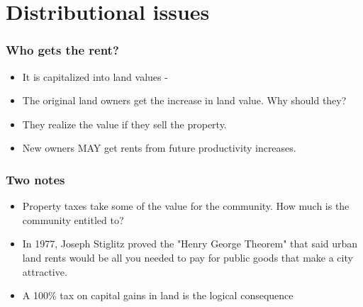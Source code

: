 \documentclass[notes]{beamer}
\begin{document}
\begin{frame}
\end{frame}

\section{Distributional issues}%
\begin{frame}\frametitle{Who gets the rent?}

\begin{itemize}
\item It is capitalized into land values - 
\item The original land owners get the increase in land value. Why should they?
\item They realize the value if they sell the property.
\item New owners MAY get rents from future productivity increases.\vspace{1cm}
\end {itemize}
\end{frame}
\begin{frame}\frametitle{Two notes}

\begin{itemize}
\item Property taxes take some of the value for the community. How much is the community entitled to?

\item In 1977, Joseph Stiglitz  proved the "Henry George Theorem" that said urban land rents would be all you needed to pay for public goods that make a city attractive. 

\item A 100\% tax on capital gains in land is the logical consequence
\end {itemize}


\end{frame}
\end{document}
